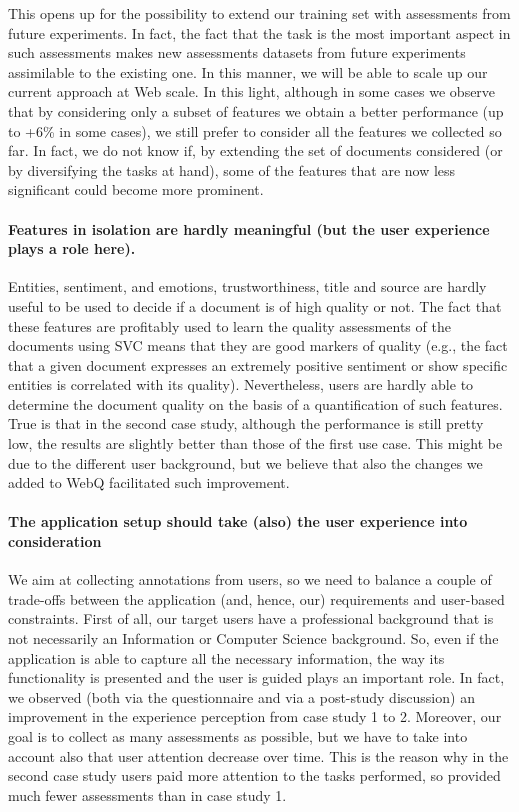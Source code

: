 \documentclass{llncs}
\begin{document}
This opens up for the possibility to extend our training set with assessments from future experiments. In fact, the fact that the task is the most important aspect in such assessments makes new assessments datasets from future experiments assimilable to the existing one. In this manner, we will be able to scale up our current approach at Web scale.
In this light, although in some cases we observe that by considering only a subset of features we obtain a better performance (up to +6\% in some cases), we still prefer to consider all the features we collected so far. In fact, we do not know if, by extending the set of documents considered (or by diversifying the tasks at hand), some of the features that are now less significant could become more prominent.

\paragraph{{\bf Features in isolation are hardly meaningful (but the user experience plays a role here).}}
Entities, sentiment, and emotions, trustworthiness, title and source are hardly useful to be used to decide if a document is of high quality or not. The fact that these features are profitably used to learn the quality assessments of the documents using SVC means that they are good markers of quality (e.g., the fact that a given document expresses an extremely positive sentiment or show specific entities is correlated with its quality). Nevertheless, users are hardly able to determine the document quality on the basis of a quantification of such features. True is that in the second case study, although the performance is still pretty low, the results are slightly better than those of the first use case. This might be due to the different user background, but we believe that also the changes we added to WebQ facilitated such improvement.

\paragraph{{\bf The application setup should take (also) the user experience into consideration}}
We aim at collecting annotations from users, so we need to balance a couple of trade-offs between the application (and, hence, our) requirements and user-based constraints. First of all, our target users have a professional background that is not necessarily an Information or Computer Science background. So, even if the application is able to capture all the necessary information, the way its functionality is presented and the user is guided plays an important role. In fact, we observed (both via the questionnaire and via a post-study discussion) an improvement in the experience perception from case study 1 to 2. Moreover, our goal is to collect as many assessments as possible, but we have to take into account also that user attention decrease over time. This is the reason why in the second case study users paid more attention to the tasks performed, so provided much fewer assessments than in case study 1.
\end{document}
